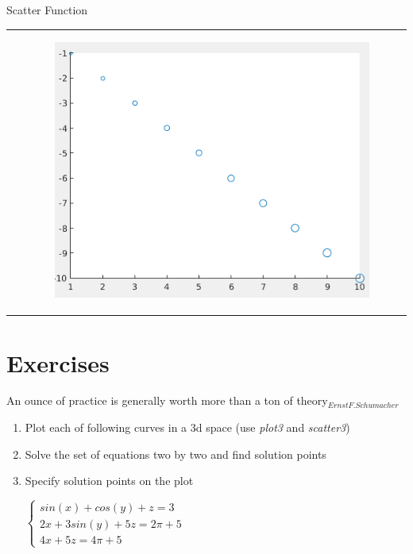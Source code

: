 \documentclass{beamer}
\begin{document}
\begin{frame}[fragile]{Scatter Function}
\begin{block}{}
\begin{itemize}
\begin{tabular}{p{}p{}}
\begin{minipage}{0.4\textwidth}
			\end{minipage}
			&
			\begin{minipage}{0.4\textwidth}
			\begin{figure}[H]
				\centering
				\includegraphics[scale=0.2]{./Imgs/scatter2.png}
			\end{figure}
			
			\end{minipage}
			\end{tabular}
			
			
		\end{itemize}
	\end{block}
\end{frame}


\section{Exercises}

\begin{frame}{}
	\begin{block}{An ounce of practice is generally worth more than a ton of theory$_{Ernst F. Schumacher}$}
		\begin{enumerate}
			\item Plot each of following curves in a 3d space (use \textit{plot3}  and \textit{scatter3})
			\item Solve the set of equations two by two and find solution points
			\item Specify solution points on the plot
			\begin{center}
			$
			\left\{
				\begin{array}{ll}
					sin(x) + cos(y) + z = 3  \\
					2x + 3sin(y) + 5z = 2\pi + 5 \\
					4x + 5z = 4\pi + 5 
				\end{array}
			\right.
			$
			\end{center}
		\end{enumerate}
	\end{block}
\end{frame}
\end{document}
